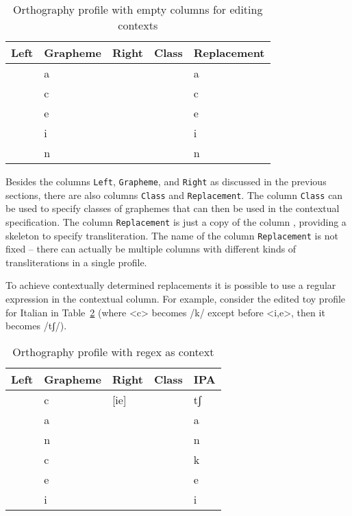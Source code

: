 \documentclass[output=book,nonflat,modfonts,
colorlinks, citecolor=brown,
		]{langsci/langscibook}\usepackage[]{graphicx}\usepackage[]{color}
\begin{document}
\begin{table}[htb]
\centering
\begingroup\scriptsize
\begin{tabular}{lllll}
  \toprule
Left & Grapheme & Right & Class & Replacement \\ 
  \midrule
 & a &  &  & a \\ 
   & c &  &  & c \\ 
   & e &  &  & e \\ 
   & i &  &  & i \\ 
   & n &  &  & n \\ 
   \bottomrule
\end{tabular}
\endgroup
\caption{Orthography profile with empty columns for editing contexts} 
\label{tab:profile_editing_1}
\end{table}


Besides the columns \texttt{Left}, \texttt{Grapheme}, and \texttt{Right} as
discussed in the previous sections, there are also columns \texttt{Class} and
\texttt{Replacement}. The column \texttt{Class} can be used to specify classes
of graphemes that can then be used in the contextual specification. The column
\texttt{Replacement} is just a copy of the column , providing a
skeleton to specify transliteration. The name of the column
\texttt{Replacement} is not fixed -- there can actually be multiple columns with 
different kinds of transliterations in a single profile.

To achieve contextually determined replacements it is possible to use a regular
expression in the contextual column. For example, consider the edited toy
profile for Italian in Table~\ref{tab:profile_editing_2} (where <c> becomes /k/
except before <i,e>, then it becomes /tʃ/). 

\begin{table}[htb]
\centering
\begingroup\scriptsize
\begin{tabular}{lllll}
  \toprule
Left & Grapheme & Right & Class & IPA \\ 
  \midrule
 & c & [ie] &  & tʃ \\ 
   & a &  &  & a \\ 
   & n &  &  & n \\ 
   & c &  &  & k \\ 
   & e &  &  & e \\ 
   & i &  &  & i \\ 
   \bottomrule
\end{tabular}
\endgroup
\caption{Orthography profile with regex as context} 
\label{tab:profile_editing_2}
\end{table}
\end{document}
